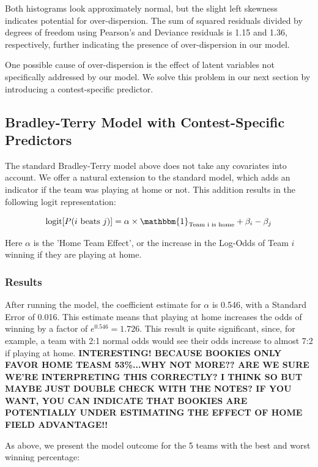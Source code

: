 \documentclass{article}
\begin{document}
Both histograms look approximately normal, but the slight left skewness indicates potential for over-dispersion. The sum of squared residuals divided by degrees of freedom using Pearson's and Deviance residuals is 1.15 and 1.36, respectively, further indicating the presence of over-dispersion in our model.

One possible cause of over-dispersion is the effect of latent variables not specifically addressed by our model. We solve this problem in our next section by introducing a contest-specific predictor.

\subsection{Bradley-Terry Model with Contest-Specific Predictors}

The standard Bradley-Terry model above does not take any covariates into account. We offer a natural extension to the standard model, which adds an indicator if the team was playing at home or not. This addition results in the following logit representation:

$$\text{logit}[P(i \text{ beats } j)] = \alpha \times \mathbbm{1}_{\text{Team i is home}} + \beta_i - \beta_j$$

Here $\alpha$ is the 'Home Team Effect', or the increase in the Log-Odds of Team $i$ winning if they are playing at home.

\subsubsection{Results}

After running the model, the coefficient estimate for $\alpha$ is 0.546, with a Standard Error of 0.016. This estimate means that playing at home increases the odds of winning by a factor of $e^{0.546} = 1.726$. This result is quite significant, since, for example, a team with 2:1 normal odds would see their odds increase to almost 7:2 if playing at home. \textbf{INTERESTING! BECAUSE BOOKIES ONLY FAVOR HOME TEASM 53\%...WHY NOT MORE?? ARE WE SURE WE'RE INTERPRETING THIS CORRECTLY? I THINK SO BUT MAYBE JUST DOUBLE CHECK WITH THE NOTES? IF YOU WANT, YOU CAN INDICATE THAT BOOKIES ARE POTENTIALLY UNDER ESTIMATING THE EFFECT OF HOME FIELD ADVANTAGE!!}

As above, we present the model outcome for the 5 teams with the best and worst winning percentage:
\end{document}
